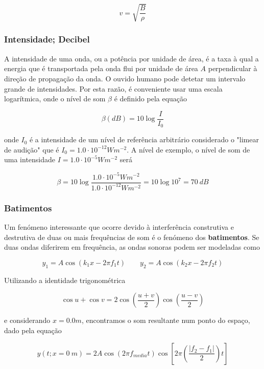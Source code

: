 \begin{equation}
    v=\sqrt{\frac{B}{\rho}}
\end{equation}

\subsubsection{Intensidade; Decibel}
A intensidade de uma onda, ou a potência por unidade de área, é a taxa à qual a energia que é transportada pela onda flui por unidade de área $A$ perpendicular à direção de propagação da onda. O ouvido humano pode detetar um intervalo grande de intensidades. Por esta razão, é conveniente usar uma escala logarítmica, onde o nível de som $\beta$ é definido pela equação

\begin{equation}
    \beta (dB)=10\log\frac{I}{I_0}
\end{equation}

onde $I_0$ é a intensidade de um nível de referência arbitrário considerado o "limear de audição" que é $I_0=1.0\cdot 10^{-12}Wm^{-2}$. A nível de exemplo, o nível de som de uma intensidade $I=1.0\cdot 10^{-5}Wm^{-2}$ será

\begin{equation}
    \beta=10\log\frac{1.0\cdot 10^{-5}Wm^{-2}}{1.0\cdot 10^{-12}Wm^{-2}}=10\log10^7=70\ dB
\end{equation}

\subsubsection{Batimentos}
Um fenómeno interessante que ocorre devido à interferência construtiva e destrutiva de duas ou mais frequências de som é o fenómeno dos \textbf{batimentos}. Se duas ondas diferirem em frequência, as ondas sonoras podem ser modeladas como

\begin{equation}
    y_1=A\cos(k_1x-2\pi f_1t) \qquad y_2=A\cos(k_2x-2\pi f_2t)
\end{equation}

Utilizando a identidade trigonométrica

\begin{equation}
    \cos u + \cos v=2\cos(\frac{u+v}{2})\cos (\frac{u-v}{2})
\end{equation}

e considerando $x=0.0m$, encontramos o som resultante num ponto do espaço, dado pela equação

\begin{equation}
    y(t; x=0\ m)=2A\cos(2\pi f_{media}t)\cos[2\pi(\frac{|f_2-f_1|}{2})t]
\end{equation}

